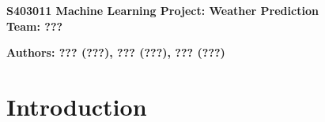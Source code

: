 \documentclass[a4,a4paper,11pt,english]{article}
\numberwithin{equation}{section}
\numberwithin{figure}{section}
\numberwithin{table}{section}
\begin{document}
	 \begin{center}
	 	\LARGE \textbf{
	 			S403011 Machine Learning Project: Weather Prediction \\ 
	 			Team: ???
 		}
 	\end{center}
	\textbf{Authors: ??? (???), ??? (???), ??? (???)}
	\par
	
	\section{Introduction}
	
	
\end{document}
